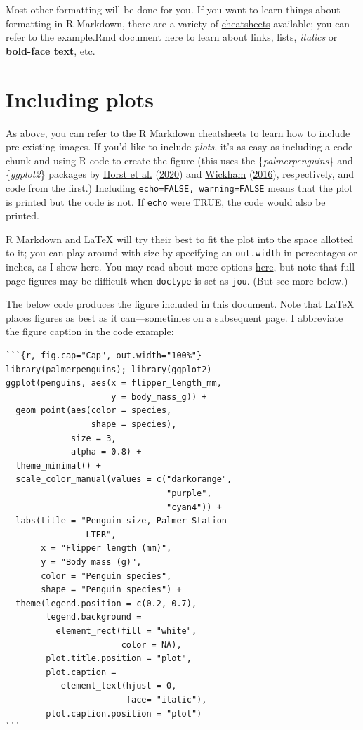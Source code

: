 \documentclass[jou]{apa7}
\begin{document}
Most other formatting will be done for you. If you want to learn things
about formatting in R Markdown, there are a variety of
\href{https://rmarkdown.rstudio.com/lesson-15.html}{cheatsheets}
available; you can refer to the example.Rmd document here to learn about
links, lists, \emph{italics} or \textbf{bold-face text}, etc.

\hypertarget{including-plots}{%
\section{Including plots}\label{including-plots}}

As above, you can refer to the R Markdown cheatsheets to learn how to
include pre-existing images. If you'd like to include \emph{plots}, it's
as easy as including a code chunk and using R code to create the figure
(this uses the \{\emph{palmerpenguins}\} and \{\emph{ggplot2}\} packages
by \protect\hyperlink{ref-horst2020}{Horst et al.}
(\protect\hyperlink{ref-horst2020}{2020}) and
\protect\hyperlink{ref-wickham2016}{Wickham}
(\protect\hyperlink{ref-wickham2016}{2016}), respectively, and code from
the first.) Including \texttt{echo=FALSE,\ warning=FALSE} means that the
plot is printed but the code is not. If \texttt{echo} were TRUE, the
code would also be printed.

R Markdown and LaTeX will try their best to fit the plot into the space
allotted to it; you can play around with size by specifying an
\texttt{out.width} in percentages or inches, as I show here. You may
read about more options
\href{https://bookdown.org/yihui/rmarkdown/pdf-document.html\#figure-options-1}{here},
but note that full-page figures may be difficult when \texttt{doctype}
is set as \texttt{jou}. (But see more below.)

The below code produces the figure included in this document. Note that
LaTeX places figures as best as it can---sometimes on a subsequent page.
I abbreviate the figure caption in the code example:

\begin{verbatim}
```{r, fig.cap="Cap", out.width="100%"}
library(palmerpenguins); library(ggplot2)
ggplot(penguins, aes(x = flipper_length_mm, 
                     y = body_mass_g)) +
  geom_point(aes(color = species, 
                 shape = species),
             size = 3,
             alpha = 0.8) +
  theme_minimal() +
  scale_color_manual(values = c("darkorange",
                                "purple",
                                "cyan4")) +
  labs(title = "Penguin size, Palmer Station
                LTER",
       x = "Flipper length (mm)",
       y = "Body mass (g)",
       color = "Penguin species",
       shape = "Penguin species") +
  theme(legend.position = c(0.2, 0.7),
        legend.background = 
          element_rect(fill = "white",
                       color = NA),
        plot.title.position = "plot",
        plot.caption = 
           element_text(hjust = 0, 
                        face= "italic"),
        plot.caption.position = "plot")
```
\end{verbatim}
\end{document}

